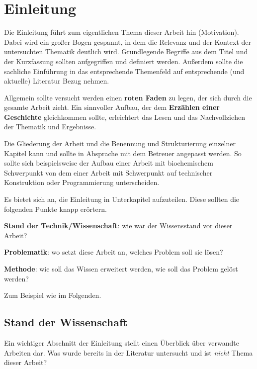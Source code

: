
\chapter{Einleitung}
\label{chapter:einleitung}

Die Einleitung führt zum eigentlichen Thema dieser Arbeit hin (Motivation). Dabei wird ein großer Bogen gespannt, in dem die Relevanz und der Kontext der untersuchten Thematik deutlich wird. Grundlegende Begriffe aus dem Titel und der Kurzfassung sollten aufgegriffen und definiert werden. Außerdem sollte die sachliche Einführung in das entsprechende Themenfeld auf entsprechende (und aktuelle) Literatur Bezug nehmen.

Allgemein sollte versucht werden einen \textbf{roten Faden} zu legen, der sich durch die gesamte Arbeit zieht. Ein sinnvoller Aufbau, der dem \textbf{Erzählen einer Geschichte} gleichkommen sollte, erleichtert das Lesen und das Nachvollziehen der Thematik und Ergebnisse.

Die Gliederung der Arbeit und die Benennung und Strukturierung einzelner Kapitel kann und sollte in Absprache mit dem Betreuer angepasst werden. So sollte sich beispielsweise der Aufbau einer Arbeit mit biochemischem Schwerpunkt von dem einer Arbeit mit Schwerpunkt auf technischer Konstruktion oder Programmierung unterscheiden.

Es bietet sich an, die Einleitung in Unterkapitel aufzuteilen. Diese sollten die folgenden Punkte knapp erörtern.

\begin{description}
	\item \textbf{Stand der Technik/Wissenschaft}: wie war der Wissensstand vor dieser Arbeit?
	\item \textbf{Problematik}: wo setzt diese Arbeit an, welches Problem soll sie lösen?
	\item \textbf{Methode}: wie soll das Wissen erweitert werden, wie soll das Problem gelöst werden?
\end{description}

Zum Beispiel wie im Folgenden.

\section{Stand der Wissenschaft}

Ein wichtiger Abschnitt der Einleitung stellt einen Überblick über verwandte Arbeiten dar. Was wurde bereits in der Literatur untersucht und ist \emph{nicht} Thema dieser Arbeit?

